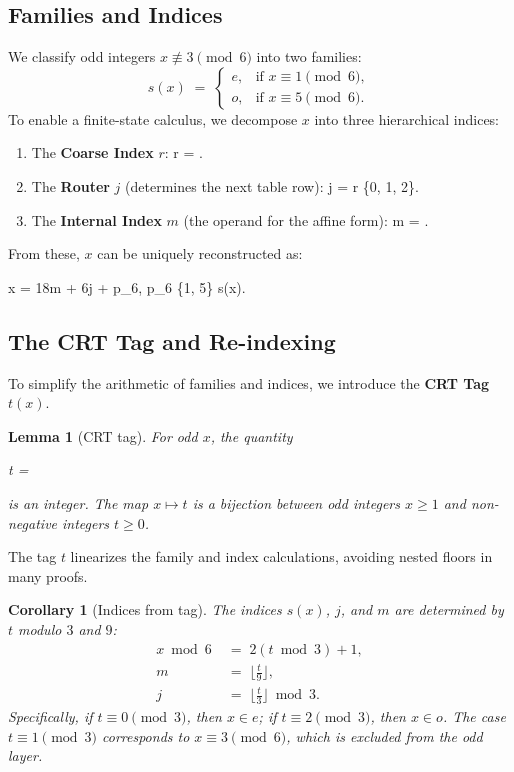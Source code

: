 \documentclass[11pt,letterpaper]{amsart}
\def\mathrm#1{#1}%
\def\[{ }%
\def\]{ }%
\theoremstyle{definition}
\theoremstyle{plain}
\newtheorem{lemma}{Lemma}
\theoremstyle{plain}
\newtheorem{corollary}[theorem]{Corollary}
\theoremstyle{remark}
\begin{document}
\subsection{Families and Indices}
We classify odd integers $x \not\equiv 3 \pmod 6$ into two families:
\begin{equation}
s(x) \;=\;
\begin{cases}
\mathrm{e}, & \text{if } x \equiv 1 \pmod 6, \\
\mathrm{o}, & \text{if } x \equiv 5 \pmod 6.
\end{cases}
\end{equation}
To enable a finite-state calculus, we decompose $x$ into three hierarchical indices:
\begin{enumerate}
    \item The \textbf{Coarse Index} $r$:
    \[ r = \Big\lfloor{}\Big\rfloor. \]
    \item The \textbf{Router} $j$ (determines the next table row):
    \[ j = r  \in \{0, 1, 2\}. \]
    \item The \textbf{Internal Index} $m$ (the operand for the affine form):
    \[ m = \Big\lfloor{}\Big\rfloor. \]
\end{enumerate}
From these, $x$ can be uniquely reconstructed as:
\[
x \;=\; 18m + 6j + p_6, \qquad {} p_6 \in \{1, 5\}  s(x).
\]

\subsection{The CRT Tag and Re-indexing}
\label{sec:crt-tag}
To simplify the arithmetic of families and indices, we introduce the \textbf{CRT Tag} $t(x)$.

\begin{lemma}[CRT tag]
\label{lem:crt-tag}
For odd $x$, the quantity
\[
t \;=\; 
\]
is an integer. The map $x \mapsto t$ is a bijection between odd integers $x \ge 1$ and non-negative integers $t \ge 0$.
\end{lemma}

The tag $t$ linearizes the family and index calculations, avoiding nested floors in many proofs.

\begin{corollary}[Indices from tag]
\label{cor:tag-indices}
The indices $s(x)$, $j$, and $m$ are determined by $t$ modulo $3$ and $9$:
\begin{align*}
x \bmod 6 \;&=\; 2(t \bmod 3) + 1, \\
m \;&=\; \Big\lfloor\frac{t}{9}\Big\rfloor, \\
j \;&=\; \Big\lfloor\frac{t}{3}\Big\rfloor \bmod 3.
\end{align*}
Specifically, if $t \equiv 0 \pmod 3$, then $x \in \mathrm{e}$; if $t \equiv 2 \pmod 3$, then $x \in \mathrm{o}$. The case $t \equiv 1 \pmod 3$ corresponds to $x \equiv 3 \pmod 6$, which is excluded from the odd layer.
\end{corollary}
\end{document}
